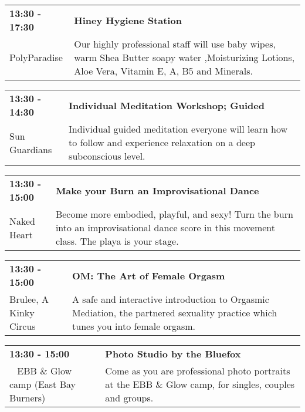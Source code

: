 \begin{tabular}{ p{1in} p{2.2in} }
    \textbf{13:30 - 17:30} & \textbf{Hiney Hygiene Station} \\
    PolyParadise \newline  & Our highly professional staff  will use baby wipes, warm Shea Butter soapy water ,Moisturizing Lotions, Aloe Vera, Vitamin E, A, B5 and Minerals. \\
    \hline 
\end{tabular}
    
\begin{tabular}{ p{1in} p{2.2in} }
    \textbf{13:30 - 14:30} & \textbf{Individual Meditation Workshop; Guided} \\
    Sun Guardians \newline  & Individual guided meditation everyone will learn how to follow and experience relaxation on a deep subconscious level. \\
    \hline 
\end{tabular}
    
\begin{tabular}{ p{1in} p{2.2in} }
    \textbf{13:30 - 15:00} & \textbf{Make your Burn an Improvisational Dance} \\
    Naked Heart \newline  & Become more embodied, playful, and sexy! Turn the burn into an improvisational dance score in this movement class. The playa is your stage. \\
    \hline 
\end{tabular}
    
\begin{tabular}{ p{1in} p{2.2in} }
    \textbf{13:30 - 15:00} & \textbf{OM: The Art of Female Orgasm} \\
    Brulee, A Kinky Circus \newline  & A safe and interactive introduction to Orgasmic Mediation, the partnered sexuality practice which tunes you into female orgasm. \\
    \hline 
\end{tabular}
    
\begin{tabular}{ p{1in} p{2.2in} }
    \textbf{13:30 - 15:00} & \textbf{Photo Studio by the Bluefox} \\
    ~ \newline EBB \& Glow camp (East Bay Burners) & Come as you are professional photo portraits at the EBB \& Glow camp, for singles, couples and groups. \\
    \hline 
\end{tabular}
    
